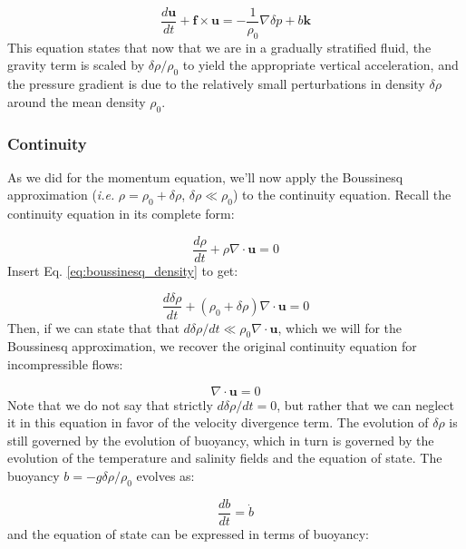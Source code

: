 \documentclass[12pt]{article}
\numberwithin{equation}{section}
\numberwithin{figure}{section}
\numberwithin{table}{section}
\begin{document}
\begin{equation}
  \frac{d \mathbf{u}}{dt} + \mathbf{f} \times \mathbf{u} =
  - \frac{1}{\rho_0} \nabla \delta p + b \mathbf{k}
\end{equation}
This equation states that now that we are in a gradually stratified fluid,
the gravity term is scaled by $\delta \rho / \rho_0$ to yield the appropriate
vertical acceleration, and the pressure gradient is due to the relatively
small perturbations in density $\delta \rho$ around  the mean density $\rho_0$.

\subsubsection{Continuity}

As we did for the momentum equation, we'll now apply the Boussinesq approximation
(\textit{i.e.} $\rho = \rho_0 + \delta \rho$, $\delta \rho \ll \rho_0$) to the
continuity equation.
Recall the continuity equation in its complete form:

\begin{equation}
  \frac{d \rho}{dt} + \rho \nabla \cdot \mathbf{u} = 0
\end{equation}
Insert Eq. \ref{eq:boussinesq_density} to get:

\begin{equation}
  \frac{d\delta \rho}{dt} + \left( \rho_0 + \delta \rho \right) \nabla \cdot \mathbf{u} = 0
\end{equation}
Then, if we can state that that $d\delta \rho / dt \ll \rho_0 \nabla \cdot \mathbf{u}$,
which we will for the Boussinesq approximation, we recover the original
continuity equation for incompressible flows:

\begin{equation}
  \nabla \cdot \mathbf{u} = 0
\end{equation}
Note that we do not say that strictly $d \delta \rho / dt = 0$, but rather that
we can neglect it in this equation in favor of the velocity divergence term.
The evolution of $\delta \rho$ is still governed by the evolution of buoyancy,
which in turn is governed by the evolution of the temperature and salinity fields
and the equation of state.
The buoyancy $b = - g \delta \rho / \rho_0$ evolves as:

\begin{equation}
  \frac{d b}{dt} = \dot{b}
\end{equation}
and the equation of state can be expressed in terms of buoyancy:
\end{document}
